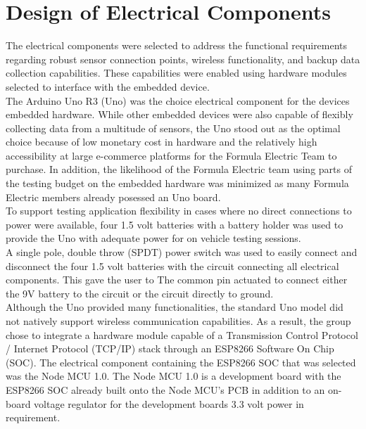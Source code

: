 \documentclass[12pt, titlepage]{article}
\begin{document}

\newpage
\section{Design of Electrical Components}


The electrical components were selected to address the functional requirements regarding robust sensor connection points, wireless functionality, and backup data collection capabilities. These capabilities were enabled using hardware modules selected to interface with the embedded device. \\

The Arduino Uno R3 (Uno) was the choice electrical component for the devices embedded hardware. While other embedded devices  were also capable of flexibly collecting data from a multitude of sensors, the Uno stood out as the optimal choice because of low monetary cost in hardware and the relatively high accessibility at large e-commerce platforms for the Formula Electric Team to purchase. In addition, the likelihood of the Formula Electric team using parts of the testing budget on the embedded hardware was minimized as many Formula Electric members already posessed an Uno board. \\

To support testing application flexibility in cases where no direct connections to power were available, four 1.5 volt batteries with a battery holder was used to provide the Uno with adequate power for on vehicle testing sessions. \\

A single pole, double throw (SPDT) power switch was used to easily connect and disconnect the four 1.5 volt batteries with the circuit connecting all electrical components. This gave the user to The common pin actuated to connect either the 9V battery to the circuit or the circuit directly to ground. \\

Although the Uno provided many functionalities, the standard Uno model did not natively support wireless communication capabilities. As a result, the group chose to integrate a hardware module capable of a Transmission Control Protocol / Internet Protocol (TCP/IP) stack through an ESP8266 Software On Chip (SOC). The electrical component containing the ESP8266 SOC that was selected was the Node MCU 1.0. The Node MCU 1.0 is a development board with the ESP8266 SOC already built onto the Node MCU's PCB in addition to an on-board voltage regulator for the development boards 3.3 volt power in requirement. \\
\end{document}
